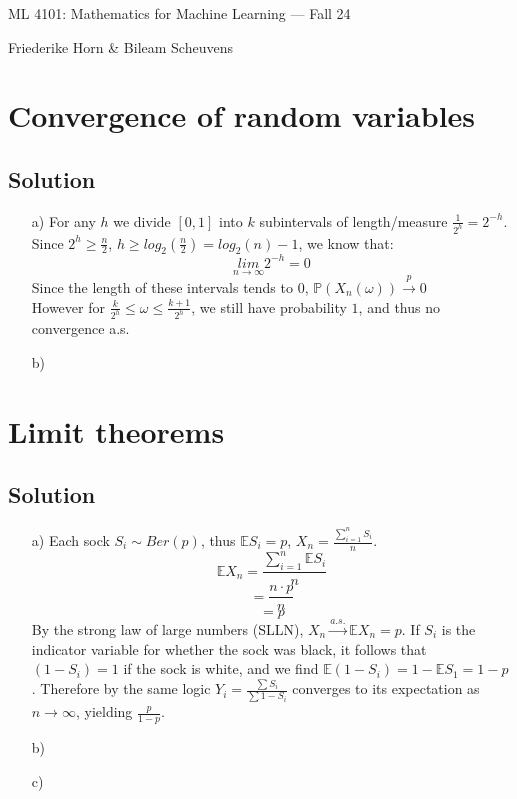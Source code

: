 \documentclass[10pt]{article}
\numberwithin{equation}{section}
\begin{document}
\begin{center}
    \sc ML 4101: Mathematics for Machine Learning --- Fall 24
\end{center}

\noindent Friederike Horn \& Bileam Scheuvens

\section*{Convergence of random variables}

\subsection*{Solution}
\begin{enumerate}
  \item[a)]{
    For any $h$ we divide $[0,1]$ into $k$ subintervals of length/measure $\frac{1}{2^h} = 2^{-h}$.\\
      Since $2^h \geq \frac{n}{2}$, $h \geq log_2(\frac{n}{2}) = log_2(n) - 1$, we know that:
      $$\underset{n\rightarrow \infty}{lim} 2^{-h} = 0$$
      Since the length of these intervals tends to $0$, $\mathbb{P}(X_n(\omega)) \overset{p}{\rightarrow} 0$\\
      However for $\frac{k}{2^h} \leq \omega \leq \frac{k+1}{2^h}$, we still have probability $1$, and thus no convergence a.s.
    }
  \item[b)]{

    }
\end{enumerate}

\section*{Limit theorems}

\subsection*{Solution}
\begin{enumerate}
  \item[a)]{
      Each sock $S_i \sim Ber(p)$, thus $\mathbb{E} S_i = p$, $X_n = \frac{\sum_{i=1}^n S_i}{n}$.
      $$\mathbb{E} X_n = \frac{\sum_{i=1}^n \mathbb{E} S_i}{n}$$
      $$= \frac{n \cdot p}{n}$$
      $$=p$$
      By the strong law of large numbers (SLLN), $X_n \overset{a.s.}{\rightarrow} \mathbb{E}X_n = p$.
      If $S_i$ is the indicator variable for whether the sock was black, it follows that $(1-S_i) = 1$ if the sock is white, and we find $\mathbb{E} (1-S_i) = 1-\mathbb{E} S_1 = 1-p$.
      Therefore by the same logic $Y_i = \frac{\sum S_i}{\sum 1-S_i}$ converges to its expectation as $n\rightarrow \infty$, yielding $\frac{p}{1-p}$.
    }
  \item[b)]{}
  \item[c)]{}
\end{enumerate}
\end{document}
